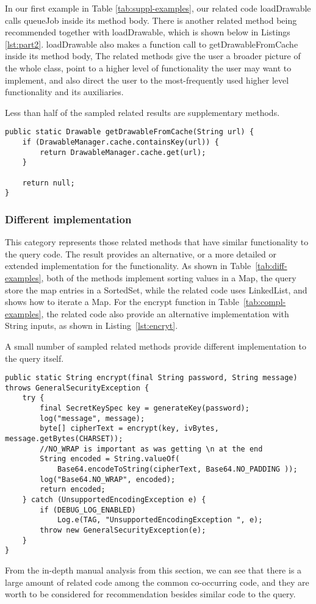 In our first example in Table \ref{tab:suppl-examples}, our related code {\ttt loadDrawable} calls {\ttt queueJob} inside its method body. 
There is another related method being recommended together with {\ttt loadDrawable}, which is shown below in Listings \ref{lst:part2}. {\ttt loadDrawable} also makes a function call to {\ttt getDrawableFromCache} inside its method body, The related methods give the user a broader picture of the whole class, point to a higher level of functionality the user may want to implement, and also direct the user to the most-frequently used higher level functionality and its auxiliaries.

Less than half of the sampled related results are supplementary methods.

\lstset{
	frame=single,
}

\vspace{2mm}
\begin{lstlisting}[style=MyJavaSmallStyle, caption={Related method \#2}, label={lst:part2}]
public static Drawable getDrawableFromCache(String url) {
	if (DrawableManager.cache.containsKey(url)) {
		return DrawableManager.cache.get(url);
	}
	
	return null;
}	
\end{lstlisting}
\vspace{2mm}

\subsubsection{Different implementation} This category represents those related methods that have similar functionality to the query code. The result provides an alternative, or a more detailed or extended implementation for the functionality. As shown in Table~\ref{tab:diff-examples}, both of the methods implement sorting values in a {\ttt Map}, the query store the map entries in a {\ttt SortedSet}, while the related code uses {\ttt LinkedList}, and shows how to iterate a {\ttt Map}. For the {\ttt encrypt} function in Table~\ref{tab:compl-examples}, the related code also provide an alternative implementation with {\ttt String} inputs, as shown in Listing~\ref{lst:encryt}.

A small number of sampled related methods provide different implementation to the query itself.
\newpage
\begin{lstlisting}[style=MyJavaSmallStyle, caption={different implementation for \texttt{encrypt}}, label={lst:encryt}]
public static String encrypt(final String password, String message) throws GeneralSecurityException {
	try {
		final SecretKeySpec key = generateKey(password);
		log("message", message);
		byte[] cipherText = encrypt(key, ivBytes, message.getBytes(CHARSET));
		//NO_WRAP is important as was getting \n at the end
		String encoded = String.valueOf(
			Base64.encodeToString(cipherText, Base64.NO_PADDING ));
		log("Base64.NO_WRAP", encoded);
		return encoded;
	} catch (UnsupportedEncodingException e) {
		if (DEBUG_LOG_ENABLED)
			Log.e(TAG, "UnsupportedEncodingException ", e);
		throw new GeneralSecurityException(e);
	}
}
\end{lstlisting}


From the in-depth manual analysis from this section, we can see that there is a large amount of related code among the common co-occurring code, and they are worth to be considered for recommendation besides similar code to the query.


